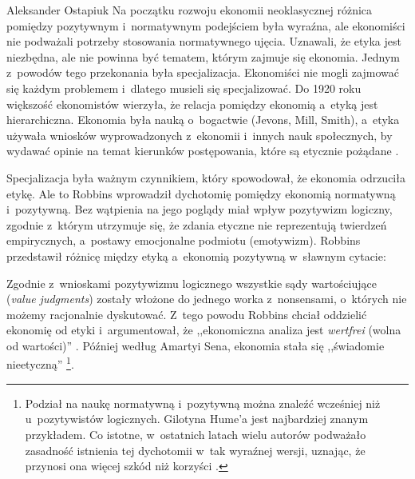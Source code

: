 \begin{artplenv}{Aleksander Ostapiuk}
Na początku rozwoju ekonomii neoklasycznej różnica pomiędzy pozytywnym i~normatywnym podejściem była wyraźna, ale ekonomiści nie
podważali potrzeby stosowania normatywnego ujęcia. Uznawali, że etyka jest niezbędna, ale nie powinna być tematem,
którym zajmuje się ekonomia. Jednym z~powodów tego przekonania była specjalizacja. Ekonomiści nie mogli zajmować się
każdym problemem i~dlatego musieli się specjalizować. Do 1920 roku większość ekonomistów wierzyła, że relacja pomiędzy
ekonomią a~etyką jest hierarchiczna. Ekonomia była nauką o~bogactwie (Jevons, Mill, Smith), a~etyka używała wniosków wyprowadzonych
z~ekonomii i~innych nauk społecznych, by wydawać opinie na temat kierunków postępowania, które są etycznie pożądane
\parencite{yuengert_positive-normative_2000}.

Specjalizacja była ważnym czynnikiem, który spowodował, że ekonomia odrzuciła etykę. Ale to Robbins wprowadził dychotomię
pomiędzy ekonomią normatywną i~pozytywną. Bez wątpienia na jego poglądy miał wpływ pozytywizm logiczny, zgodnie z~którym
utrzymuje się, że zdania etyczne nie reprezentują twierdzeń empirycznych, a~postawy emocjonalne podmiotu (emotywizm). Robbins
przedstawił różnicę między etyką a~ekonomią pozytywną w~sławnym cytacie:


Zgodnie z~wnioskami pozytywizmu logicznego wszystkie sądy wartościujące (\textit{value judgments}) zostały włożone do
jednego worka z~nonsensami, o~których nie możemy racjonalnie dyskutować. Z~tego powodu Robbins chciał oddzielić
ekonomię od etyki i~argumentował, że ,,ekonomiczna analiza jest \textit{wertfrei }(wolna od wartości)''
\parencite[s.~91]{robbins_essay_1935}.
Później według Amartyi Sena, ekonomia stała się ,,świadomie nieetyczną''
\parencite[s.~2]{sen_ethics_1987}\footnote{Podział na naukę normatywną i~pozytywną można znaleźć wcześniej niż
u~pozytywistów logicznych. Gilotyna Hume'a jest najbardziej znanym przykładem. Co istotne, w~ostatnich latach wielu
autorów podważało zasadność istnienia tej dychotomii w~tak wyraźnej wersji, uznając, że przynosi ona więcej szkód niż
korzyści
\parencite{blaug_metodologia_1995,putnam_collapse_2002,mongin_value_2006,czarny_pozytywizm_2010}.
}. 


\end{artplenv}

